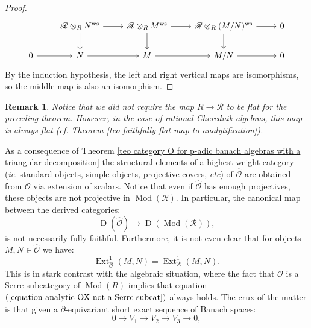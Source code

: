 \documentclass{amsart}
\newtheorem{obs}[defi]{{Remark}}
\newcommand{\Mod}{\operatorname{Mod}}
\newcommand{\OX}{\mathcal{O}}
\begin{document}
\begin{proof}
\begin{equation*}
\begin{tikzcd}
            & \mathscr{R}\otimes_R N^{\operatorname{ws}} \arrow[d] \arrow[r] & \mathscr{R}\otimes_R M^{\operatorname{ws}} \arrow[d] \arrow[r] & \mathscr{R}\otimes_R(M/N)^{\operatorname{ws}} \arrow[d] \arrow[r] & 0 \\
0 \arrow[r] & N \arrow[r]                                                    & M \arrow[r]                                                    & M/N \arrow[r]                                                     & 0
\end{tikzcd} 
\end{equation*}
By the induction hypothesis, the left and right vertical maps are isomorphisms, so the middle map is also an isomorphism. 
\end{proof}
\begin{obs}
 Notice that we did not require the map $R\rightarrow \mathscr{R}$ to be flat for the preceding theorem. However, in the case of rational Cherednik algebras, this map is always flat (cf. Theorem \ref{teo faithfully flat map to analytification}).   
\end{obs}
As a consequence of Theorem \ref{teo category O for p-adic banach algebras with a triangular decomposition} the structural elements of a highest weight category (\emph{ie}. standard objects, simple objects, projective covers, \emph{etc}) of $\widehat{\OX}$ are obtained from $\OX$ via extension of scalars. Notice that even if $\widehat{\OX}$ has enough projectives, these objects are not projective in $\Mod(\mathscr{R})$. In particular, the canonical map between the derived categories:
\begin{equation*}
    \operatorname{D}(\widehat{\OX})\rightarrow \operatorname{D}(\Mod(\mathscr{R})),
\end{equation*}
is not necessarily fully faithful. Furthermore, it is not even clear that for objects $M,N\in \widehat{\OX}$ we have:
\begin{equation}\label{equation analytic OX not a Serre subcat}
    \operatorname{Ext}^1_{\widehat{\OX}}(M,N)=\operatorname{Ext}^1_{\mathscr{R}}(M,N).
\end{equation}
This is in stark contrast with the algebraic situation, where the fact that $\OX$ is a Serre subcategory of $\Mod(R)$ implies that equation $(\ref{equation analytic OX not a Serre subcat})$ always holds. The crux of the matter is that given a $\partial$-equivariant short exact sequence of Banach spaces:
\begin{equation*}
    0\rightarrow V_1\rightarrow V_2\rightarrow V_3\rightarrow 0,
\end{equation*}
\end{document}
